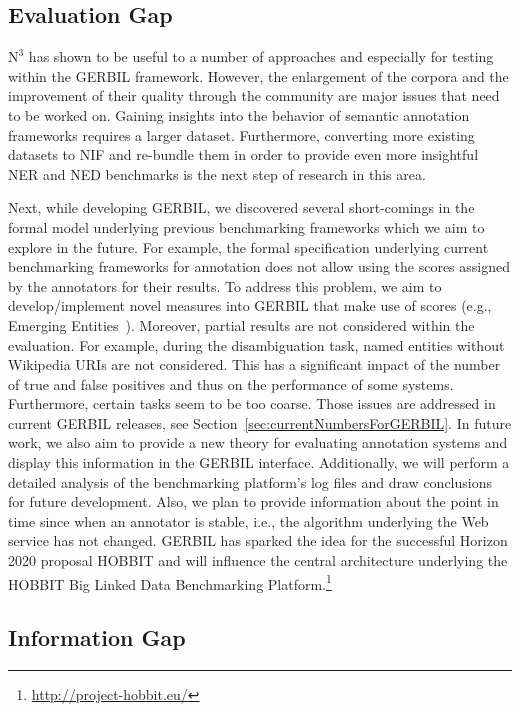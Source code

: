 \subsection*{Evaluation Gap}

$\mbox{N}^3$ has shown to be useful to a number of approaches and especially for testing within the GERBIL framework. 
However, the enlargement of the corpora and the improvement of their quality through the community are major issues that need to be worked on. 
Gaining insights into the behavior of semantic annotation frameworks requires a larger dataset.
Furthermore, converting more existing datasets to NIF and re-bundle them in order to provide even more insightful NER and NED benchmarks is the next step of research in this area.


Next, while developing GERBIL, we discovered several short-comings in the formal model underlying previous benchmarking frameworks which we aim to explore in the future. 
For example, the formal specification underlying current benchmarking frameworks for annotation does not allow using the scores assigned by the annotators for their results. 
To address this problem, we aim to develop/implement novel measures into GERBIL that make use of scores (e.g., Emerging Entities~\cite{Hoffart:2014:DEE:2566486.2568003}).
Moreover, partial results are not considered within the evaluation. 
For example, during the disambiguation task, named entities without Wikipedia URIs are not considered. 
This has a significant impact of the number of true and false positives and thus on the performance of some systems.
Furthermore, certain tasks seem to be too coarse. 
Those issues are addressed in current GERBIL releases, see Section~\ref{sec:currentNumbersForGERBIL}. 
In future work, we also aim to provide a new theory for evaluating annotation systems and display this information in the GERBIL interface.
Additionally, we will perform a detailed analysis of the benchmarking platform's log files and draw conclusions for future development.
Also, we plan to provide information about the point in time since when an annotator is stable, i.e., the algorithm underlying the Web service has not changed.
GERBIL has sparked the idea for the successful Horizon 2020 proposal HOBBIT and will influence the central architecture underlying the HOBBIT Big Linked Data Benchmarking Platform.\footnote{\url{http://project-hobbit.eu/}} 


\subsection*{Information Gap}

